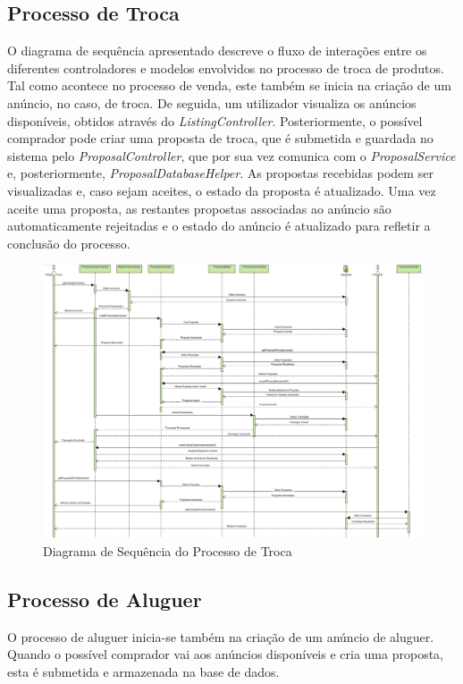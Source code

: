 \documentclass[a4paper, 12pt]{article} %
\begin{document}
\subsection{Processo de Troca}
O diagrama de sequência apresentado descreve o fluxo de interações entre os diferentes controladores e modelos envolvidos no processo de troca de produtos. 
Tal como acontece no processo de venda, este também se inicia na criação de um anúncio, no caso, de troca.
De seguida, um utilizador visualiza os anúncios disponíveis, obtidos através do \textit{ListingController}. Posteriormente, o possível comprador pode criar uma proposta de troca, que é submetida e guardada no sistema pelo \textit{ProposalController}, que por sua vez comunica com o \textit{ProposalService} e, posteriormente, \textit{ProposalDatabaseHelper}. As propostas recebidas podem ser visualizadas e, caso sejam aceites, o estado da proposta é atualizado. Uma vez aceite uma proposta, as restantes propostas associadas ao anúncio são automaticamente rejeitadas e o estado do anúncio é atualizado para refletir a conclusão do processo.
\newpage
\begin{figure}[H]
	\centering
	\includegraphics[width=\textwidth,height=\textheight,keepaspectratio]{../images/sequence-diagram-swap.png}
	\caption{Diagrama de Sequência do Processo de Troca}
	\label{fig:diagrama_sequencia_troca}
\end{figure}
\newpage
\subsection{Processo de Aluguer}
O processo de aluguer inicia-se também na criação de um anúncio de aluguer.
Quando o possível comprador vai aos anúncios disponíveis e cria uma proposta, esta é submetida e armazenada na base de dados.
\end{document}
